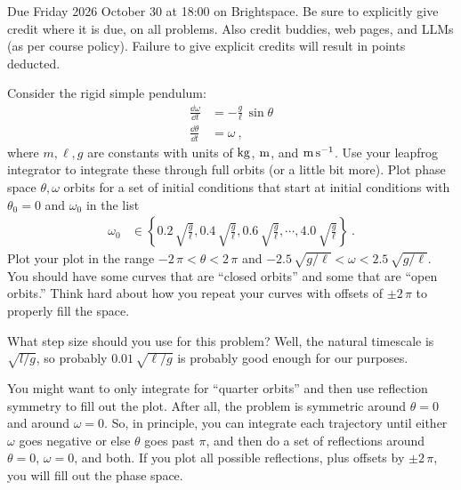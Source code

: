 \documentclass[12pt]{article}
\begin{document}
Due Friday 2026 October 30 at 18:00 on Brightspace.
Be sure to explicitly give credit where it is due, on all problems.
Also credit buddies, web pages, and LLMs (as per course policy).
Failure to give explicit credits will result in points deducted.

\begin{problem}
  Consider the rigid simple pendulum:
  \begin{align}
    \frac{\dd\omega}{\dd t} &= -\frac{g}{\ell}\,\sin\theta \\
    \frac{\dd\theta}{\dd t} &= \omega ~,
  \end{align}
  where $m,\ell,g$ are constants with units of $\mathrm{kg}$, $\mathrm{m}$, and $\mathrm{m}\,\mathrm{s}^{-1}$.
  Use your leapfrog integrator to integrate these through full orbits (or a little bit more).
  Plot phase space $\theta, \omega$ orbits for a set of initial conditions
  that start at initial conditions with $\theta_0=0$ and $\omega_0$ in the list
  \newcommand{\foo}{\sqrt{\frac{g}{\ell}}}
  \begin{align}
    \omega_0 &\in \left\{0.2\,\foo, 0.4\,\foo, 0.6\,\foo, \cdots, 4.0\,\foo \right\} ~.
  \end{align}
  Plot your plot in the range $-2\,\pi<\theta<2\,\pi$ and $-2.5\,\sqrt{g/\ell}<\omega<2.5\,\sqrt{g/\ell}$.
  You should have some curves that are ``closed orbits'' and some that are ``open orbits.''
  Think hard about how you repeat your curves with offsets of $\pm2\,\pi$ to properly fill the space.
\end{problem}

\begin{note}
  What step size should you use for this problem?
  Well, the natural timescale is $\sqrt{l/g}$, so probably $0.01\,\sqrt{\ell/g}$ is probably good enough for our purposes.
\end{note}
  
\begin{note}
  You might want to only integrate for ``quarter orbits'' and then use reflection symmetry to fill out the plot.
  After all, the problem is symmetric around $\theta=0$ and around $\omega=0$.
  So, in principle, you can integrate each trajectory until either $\omega$ goes negative or else $\theta$ goes past $\pi$, and then do a set of reflections around $\theta=0$, $\omega=0$, and both.
  If you plot all possible reflections, plus offsets by $\pm 2\,\pi$, you will fill out the phase space.
\end{note}
\end{document}
